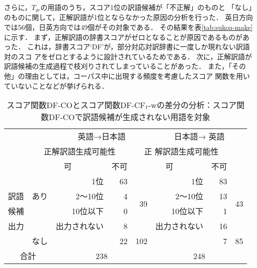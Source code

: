 \documentclass[japanese]{jnlp_1.3a}
\begin{document}
さらに，$T_{gc}$の用語のうち，スコア1位の訳語候補が「不正解」のものと
「なし」のものに関して，正解訳語が1位とならなかった原因の分析を行った．
英日方向では56個，日英方向では49個がその対象である．
その結果を表\ref{tab:sukoa-make}に示す．
まず，正解訳語の辞書スコアがゼロとなることが原因であるものがあった．
これは，辞書スコア`DF'が，部分対応対訳辞書に一度しか現れない訳語対のスコ
アをゼロとするように設計されているためである．
次に，正解訳語が訳語候補の生成過程で枝刈りされてしまっていることがあった．
また，「その他」の理由としては，コーパス中に出現する頻度を考慮したスコア
関数を用いていないことなどが挙げられる．

\begin{table}[b]
 \small
 \centering
 \caption{スコア関数DF-COとスコア関数DF-CF${\rm _f}$-wの差分の分析：スコア関数DF-COで訳語候補が生\hspace*{32pt}成されない用語を対象}
 \label{tab:DF-CFf-w}
 \begin{tabular}{|l|r|rr|r|rr|r|}
  \hline
      \multicolumn{2}{|c}{} &\multicolumn{3}{|c|}{英語→日本語} 
	& \multicolumn{3}{|c|}{日本語→
  英語}\\
  \hhline{|~~|---|---|}
      \multicolumn{2}{|c}{} & \multicolumn{3}{|c|}{正解訳語生成可能性} 
	& \multicolumn{3}{|c|}{正
  解訳語生成可能性}\\
  \hhline{|~~|---|---|}
      \multicolumn{2}{|c}{} & \multicolumn{2}{|c|}{可} 
	& 不可 & \multicolumn{2}{|c|}{可}
  & 不可 \\
  \hline\hline
   &  & 1位 & 63 &  & 1位 & 83 & \\
  \hhline{|~~|--~|--~|}
  訳語 & あり & 2〜10位 & 4 & \multirow{2}{*}{39} & 2〜10位 & 13 & \multirow{2}{*}{43}\\
  \hhline{|~~|--~|--~|}
  候補 &  & 10位以下 & 0 &  & 10位以下 & 1 & \\
  \hhline{|~~|--~|--~|}
  出力 &  & 出力されない & 8 &  & 出力されない & 16 & \\
  \hhline{|~|-|--|-|--|-|}
   & なし & & 22 & 102 &  & 7 & 85\\
  \hline \hline
  \multicolumn{2}{|c|}{合計} & \multicolumn{3}{|c|}{238} & \multicolumn{3}{|c|}{248}\\
  \hline
 \end{tabular}
\end{table}
\end{document}
